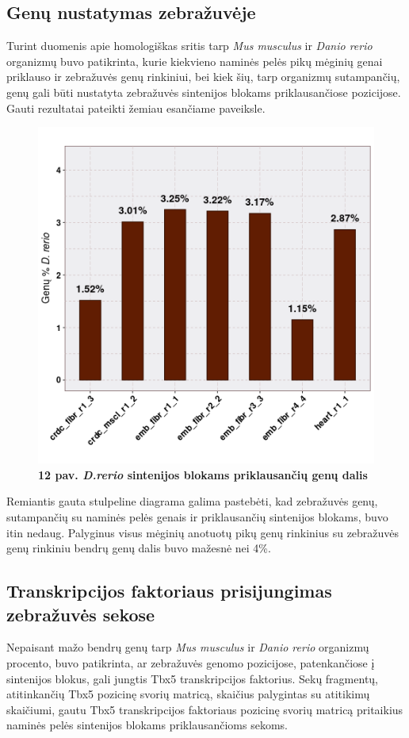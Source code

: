 \documentclass[12pt]{article}
\begin{document}
\subsection{Genų nustatymas zebražuvėje}
Turint duomenis apie homologiškas sritis tarp \emph{Mus musculus} ir
\emph{Danio rerio} organizmų buvo patikrinta, kurie kiekvieno naminės pelės pikų
mėginių genai priklauso ir zebražuvės genų rinkiniui, bei kiek šių, tarp
organizmų sutampančių, genų gali būti nustatyta zebražuvės sintenijos blokams
priklausančiose pozicijose. Gauti rezultatai pateikti žemiau esančiame
paveiksle.

\begin{figure}[htb]
    \begin{center}
        \includegraphics[width=0.7\linewidth]{../Figures/Unique_genes_DR.png}
        \vspace{-2\baselineskip}
        \caption*{\small\textbf{12 pav. \emph{D.rerio} sintenijos blokams
                                priklausančių genų dalis}}
        \label{fig:12}
    \end{center}
\end{figure}

Remiantis gauta stulpeline diagrama galima pastebėti, kad zebražuvės genų,
sutampančių su naminės pelės genais ir priklausančių sintenijos blokams, buvo
itin nedaug. Palyginus visus mėginių anotuotų pikų genų rinkinius su zebražuvės
genų rinkiniu bendrų genų dalis buvo mažesnė nei 4\%.

\newpage

\subsection{Transkripcijos faktoriaus prisijungimas zebražuvės sekose}
Nepaisant mažo bendrų genų tarp \emph{Mus musculus} ir \emph{Danio rerio}
organizmų procento, buvo patikrinta, ar zebražuvės genomo pozicijose,
patenkančiose į sintenijos blokus, gali jungtis Tbx5 transkripcijos faktorius.
Sekų fragmentų, atitinkančių Tbx5 pozicinę svorių matricą, skaičius palygintas
su atitikimų skaičiumi, gautu Tbx5 transkripcijos faktoriaus pozicinę svorių
matricą pritaikius naminės pelės sintenijos blokams priklausančioms sekoms.
\end{document}
